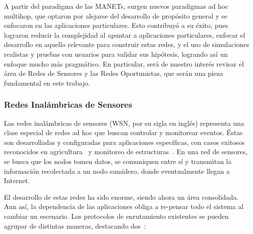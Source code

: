 \documentclass[10pt,preprint,onecolumn]{paper}
\begin{document}
A partir del paradigma de las MANETs, surgen nuevos paradigmas ad hoc multihop, que optaron por alejarse del desarrollo de propósito general y se enfocaron en las aplicaciones particulares. Esto contribuyó a su éxito, pues lograron reducir la complejidad al apuntar a aplicaciones particulares, enfocar el desarrollo en aquello relevante para construir estas redes, y el uso de simulaciones realistas y pruebas con usuarios para validar sus hipótesis, logrando así un enfoque mucho más pragmático. En particular, será de nuestro interés revisar el área de Redes de Sensores y las Redes Oportunistas, que serán una pieza fundamental en este trabajo.

\subsubsection{Redes Inalámbricas de Sensores}
Las redes inalámbricas de sensores (WSN, por su sigla en inglés) representa una clase especial de redes ad hoc que buscan controlar y monitorear eventos. Éstas son desarrolladas y configuradas para aplicaciones específicas, con casos exitosos reconocidos en agricultura~\cite{agric} y monitoreo de estructuras~\cite{struct}. En una red de sensores, se busca que los nodos tomen datos, se comuniquen entre sí y transmitan la información recolectada a un nodo sumidero, donde eventualmente llegan a Internet.

El desarrollo de estas redes ha sido enorme, siendo ahora un área consolidada. Aun así, la dependencia de las aplicaciones obliga a re-pensar todo el sistema al cambiar un escenario. Los protocolos de enrutamiento existentes se pueden agrupar de distintas maneras, destacando dos~\cite{survey2}:
\end{document}
